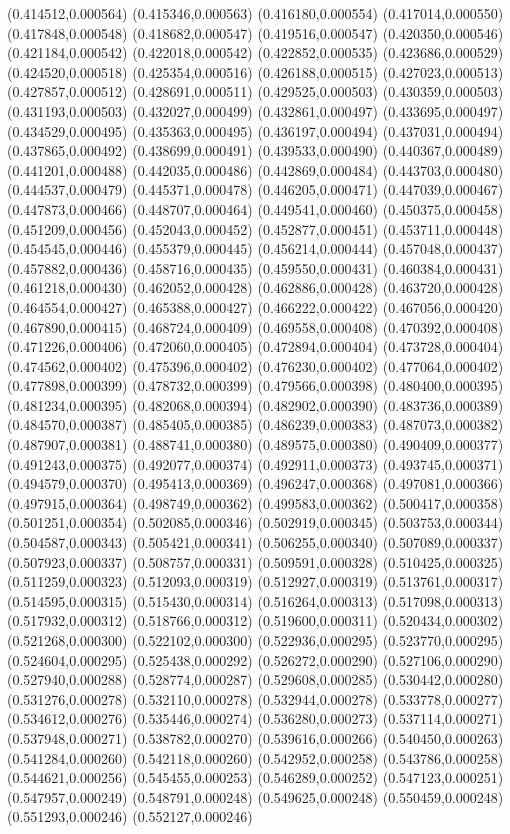 {(0.414512,0.000564) (0.415346,0.000563) (0.416180,0.000554) (0.417014,0.000550) (0.417848,0.000548) (0.418682,0.000547) (0.419516,0.000547) (0.420350,0.000546) (0.421184,0.000542) (0.422018,0.000542) (0.422852,0.000535) (0.423686,0.000529) (0.424520,0.000518) (0.425354,0.000516) (0.426188,0.000515) (0.427023,0.000513) (0.427857,0.000512) (0.428691,0.000511) (0.429525,0.000503) (0.430359,0.000503) (0.431193,0.000503) (0.432027,0.000499) (0.432861,0.000497) (0.433695,0.000497) (0.434529,0.000495) (0.435363,0.000495) (0.436197,0.000494) (0.437031,0.000494) (0.437865,0.000492) (0.438699,0.000491) (0.439533,0.000490) (0.440367,0.000489) (0.441201,0.000488) (0.442035,0.000486) (0.442869,0.000484) (0.443703,0.000480) (0.444537,0.000479) (0.445371,0.000478) (0.446205,0.000471) (0.447039,0.000467) (0.447873,0.000466) (0.448707,0.000464) (0.449541,0.000460) (0.450375,0.000458) (0.451209,0.000456) (0.452043,0.000452) (0.452877,0.000451) (0.453711,0.000448) (0.454545,0.000446) (0.455379,0.000445) (0.456214,0.000444) (0.457048,0.000437) (0.457882,0.000436) (0.458716,0.000435) (0.459550,0.000431) (0.460384,0.000431) (0.461218,0.000430) (0.462052,0.000428) (0.462886,0.000428) (0.463720,0.000428) (0.464554,0.000427) (0.465388,0.000427) (0.466222,0.000422) (0.467056,0.000420) (0.467890,0.000415) (0.468724,0.000409) (0.469558,0.000408) (0.470392,0.000408) (0.471226,0.000406) (0.472060,0.000405) (0.472894,0.000404) (0.473728,0.000404) (0.474562,0.000402) (0.475396,0.000402) (0.476230,0.000402) (0.477064,0.000402) (0.477898,0.000399) (0.478732,0.000399) (0.479566,0.000398) (0.480400,0.000395) (0.481234,0.000395) (0.482068,0.000394) (0.482902,0.000390) (0.483736,0.000389) (0.484570,0.000387) (0.485405,0.000385) (0.486239,0.000383) (0.487073,0.000382) (0.487907,0.000381) (0.488741,0.000380) (0.489575,0.000380) (0.490409,0.000377) (0.491243,0.000375) (0.492077,0.000374) (0.492911,0.000373) (0.493745,0.000371) (0.494579,0.000370) (0.495413,0.000369) (0.496247,0.000368) (0.497081,0.000366) (0.497915,0.000364) (0.498749,0.000362) (0.499583,0.000362) (0.500417,0.000358) (0.501251,0.000354) (0.502085,0.000346) (0.502919,0.000345) (0.503753,0.000344) (0.504587,0.000343) (0.505421,0.000341) (0.506255,0.000340) (0.507089,0.000337) (0.507923,0.000337) (0.508757,0.000331) (0.509591,0.000328) (0.510425,0.000325) (0.511259,0.000323) (0.512093,0.000319) (0.512927,0.000319) (0.513761,0.000317) (0.514595,0.000315) (0.515430,0.000314) (0.516264,0.000313) (0.517098,0.000313) (0.517932,0.000312) (0.518766,0.000312) (0.519600,0.000311) (0.520434,0.000302) (0.521268,0.000300) (0.522102,0.000300) (0.522936,0.000295) (0.523770,0.000295) (0.524604,0.000295) (0.525438,0.000292) (0.526272,0.000290) (0.527106,0.000290) (0.527940,0.000288) (0.528774,0.000287) (0.529608,0.000285) (0.530442,0.000280) (0.531276,0.000278) (0.532110,0.000278) (0.532944,0.000278) (0.533778,0.000277) (0.534612,0.000276) (0.535446,0.000274) (0.536280,0.000273) (0.537114,0.000271) (0.537948,0.000271) (0.538782,0.000270) (0.539616,0.000266) (0.540450,0.000263) (0.541284,0.000260) (0.542118,0.000260) (0.542952,0.000258) (0.543786,0.000258) (0.544621,0.000256) (0.545455,0.000253) (0.546289,0.000252) (0.547123,0.000251) (0.547957,0.000249) (0.548791,0.000248) (0.549625,0.000248) (0.550459,0.000248) (0.551293,0.000246) (0.552127,0.000246) }
